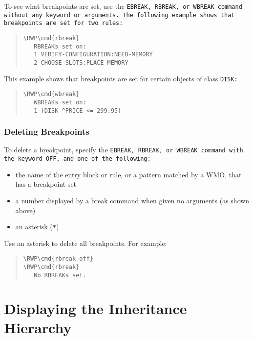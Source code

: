To see what breakpoints are set, use the \tt{EBREAK}, \tt{RBREAK}, or
\tt{WBREAK} command without any keyword or arguments. The following
example shows that breakpoints are set for two rules:

\begin{quote}
\begin{Verbatim}[commandchars=\\\{\}]
\RWP\cmd{rbreak}
   RBREAKs set on:
   1 VERIFY-CONFIGURATION:NEED-MEMORY
   2 CHOOSE-SLOTS:PLACE-MEMORY
\end{Verbatim}
\end{quote}

This example shows that breakpoints are set for certain objects of
class \tt{DISK}:

\begin{quote}
\begin{Verbatim}[commandchars=\\\{\}]
\RWP\cmd{wbreak}
   WBREAKs set on:
   1 (DISK ^PRICE <= 299.95)
\end{Verbatim}
\end{quote}

\subsubsection{Deleting Breakpoints}

To delete a breakpoint, specify the \tt{EBREAK}, \tt{RBREAK}, or
\tt{WBREAK} command with the keyword \tt{OFF}, and one of the following:

\begin{itemize}
\item the name of the entry block or rule, or a pattern matched by a
  WMO, that has a breakpoint set
\item a number displayed by a break command when given no arguments
  (as shown above)
\item an asterisk (\verb|*|)
\end{itemize}

Use an asterisk to delete all breakpoints. For example:

\begin{quote}
\begin{Verbatim}[commandchars=\\\{\}]
\RWP\cmd{rbreak off}
\RWP\cmd{rbreak}
   No RBREAKs set.
\end{Verbatim}
\end{quote}

\section{Displaying the Inheritance Hierarchy}

